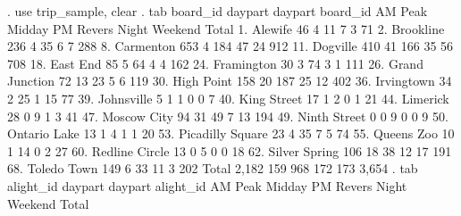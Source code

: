 . use trip_sample, clear
{\smallskip}
. tab board_id daypart
{\smallskip}
                     {\VBAR}                        daypart
            board_id {\VBAR}   AM Peak     Midday  PM Revers      Night    Weekend {\VBAR}     Total
          1. Alewife {\VBAR}        46          4         11          7          3 {\VBAR}        71 
        2. Brookline {\VBAR}       236          4         35          6          7 {\VBAR}       288 
        8. Carmenton {\VBAR}       653          4        184         47         24 {\VBAR}       912 
        11. Dogville {\VBAR}       410         41        166         35         56 {\VBAR}       708 
        18. East End {\VBAR}        85          5         64          4          4 {\VBAR}       162 
      24. Framington {\VBAR}        30          3         74          3          1 {\VBAR}       111 
  26. Grand Junction {\VBAR}        72         13         23          5          6 {\VBAR}       119 
      30. High Point {\VBAR}       158         20        187         25         12 {\VBAR}       402 
      36. Irvingtown {\VBAR}        34          2         25          1         15 {\VBAR}        77 
      39. Johnsville {\VBAR}         5          1          1          0          0 {\VBAR}         7 
     40. King Street {\VBAR}        17          1          2          0          1 {\VBAR}        21 
        44. Limerick {\VBAR}        28          0          9          1          3 {\VBAR}        41 
     47. Moscow City {\VBAR}        94         31         49          7         13 {\VBAR}       194 
    49. Ninth Street {\VBAR}         0          0          9          0          0 {\VBAR}         9 
    50. Ontario Lake {\VBAR}        13          1          4          1          1 {\VBAR}        20 
53. Picadilly Square {\VBAR}        23          4         35          7          5 {\VBAR}        74 
      55. Queens Zoo {\VBAR}        10          1         14          0          2 {\VBAR}        27 
  60. Redline Circle {\VBAR}        13          0          5          0          0 {\VBAR}        18 
   62. Silver Spring {\VBAR}       106         18         38         12         17 {\VBAR}       191 
     68. Toledo Town {\VBAR}       149          6         33         11          3 {\VBAR}       202 
               Total {\VBAR}     2,182        159        968        172        173 {\VBAR}     3,654 
{\smallskip}
{\smallskip}
. tab alight_id daypart
{\smallskip}
                     {\VBAR}                        daypart
           alight_id {\VBAR}   AM Peak     Midday  PM Revers      Night    Weekend {\VBAR}     Total
